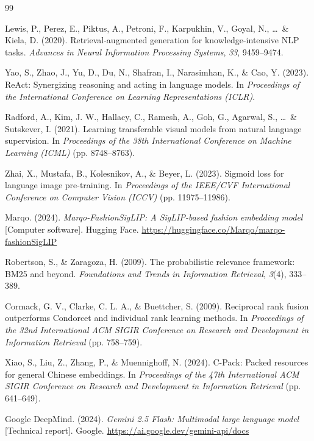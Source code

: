 \documentclass[12pt, twoside]{report}
\newcommand{\addchaptertoc}[1]{\addcontentsline{toc}{chapter}{#1}}
\begin{document}
\begin{thebibliography}{99}
\addchaptertoc{References}

Lewis, P., Perez, E., Piktus, A., Petroni, F., Karpukhin, V., Goyal, N., \ldots\ \& Kiela, D. (2020). Retrieval-augmented generation for knowledge-intensive NLP tasks. \textit{Advances in Neural Information Processing Systems}, \textit{33}, 9459--9474.

Yao, S., Zhao, J., Yu, D., Du, N., Shafran, I., Narasimhan, K., \& Cao, Y. (2023). ReAct: Synergizing reasoning and acting in language models. In \textit{Proceedings of the International Conference on Learning Representations (ICLR)}.

Radford, A., Kim, J. W., Hallacy, C., Ramesh, A., Goh, G., Agarwal, S., \ldots\ \& Sutskever, I. (2021). Learning transferable visual models from natural language supervision. In \textit{Proceedings of the 38th International Conference on Machine Learning (ICML)} (pp. 8748--8763).

Zhai, X., Mustafa, B., Kolesnikov, A., \& Beyer, L. (2023). Sigmoid loss for language image pre-training. In \textit{Proceedings of the IEEE/CVF International Conference on Computer Vision (ICCV)} (pp. 11975--11986).

Marqo. (2024). \textit{Marqo-FashionSigLIP: A SigLIP-based fashion embedding model} [Computer software]. Hugging Face. \url{https://huggingface.co/Marqo/marqo-fashionSigLIP}

Robertson, S., \& Zaragoza, H. (2009). The probabilistic relevance framework: BM25 and beyond. \textit{Foundations and Trends in Information Retrieval}, \textit{3}(4), 333--389.

Cormack, G. V., Clarke, C. L. A., \& Buettcher, S. (2009). Reciprocal rank fusion outperforms Condorcet and individual rank learning methods. In \textit{Proceedings of the 32nd International ACM SIGIR Conference on Research and Development in Information Retrieval} (pp. 758--759).

Xiao, S., Liu, Z., Zhang, P., \& Muennighoff, N. (2024). C-Pack: Packed resources for general Chinese embeddings. In \textit{Proceedings of the 47th International ACM SIGIR Conference on Research and Development in Information Retrieval} (pp. 641--649).

Google DeepMind. (2024). \textit{Gemini 2.5 Flash: Multimodal large language model} [Technical report]. Google. \url{https://ai.google.dev/gemini-api/docs}


\end{thebibliography}
\end{document}
